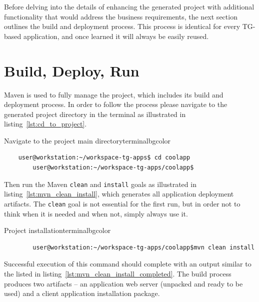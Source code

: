   Before delving into the details of enhancing the generated project with additional functionality that would address the business requirements, the next section outlines the build and deployment process.
  This process is identical for every TG-based application, and once learned it will always be easily reused.

\section{Build, Deploy, Run}
  Maven is used to fully manage the project, which includes its build and deployment process.
  In order to follow the process please navigate to the generated project directory in the terminal as illustrated in listing~\ref{lst:cd_to_project}.
  
  \begin{code}{Navigate to the project main directory}{\label{lst:cd_to_project}}{terminalbgcolor}
      \begin{lstlisting}
	user@workstation:~/workspace-tg-apps$ cd coolapp
        user@workstation:~/workspace-tg-apps/coolapp$
      \end{lstlisting}
  \end{code}

  Then run the Maven \texttt{clean} and \texttt{install} goals as illustrated in listing~\ref{lst:mvn_clean_install}, which generates all application deployment artifacts.
  The \texttt{clean} goal is not essential for the first run, but in order not to think when it is needed and when not, simply always use it.

  \begin{code}{Project installation}{\label{lst:mvn_clean_install}}{terminalbgcolor}
     \begin{lstlisting}
        user@workstation:~/workspace-tg-apps/coolapp$mvn clean install
     \end{lstlisting}
  \end{code}

  Successful execution of this command should complete with an output similar to the listed in listing~\ref{lst:mvn_clean_install_completed}.
  The build process produces two artifacts -- an application web server (unpacked and ready to be used) and a client application installation package.
  
